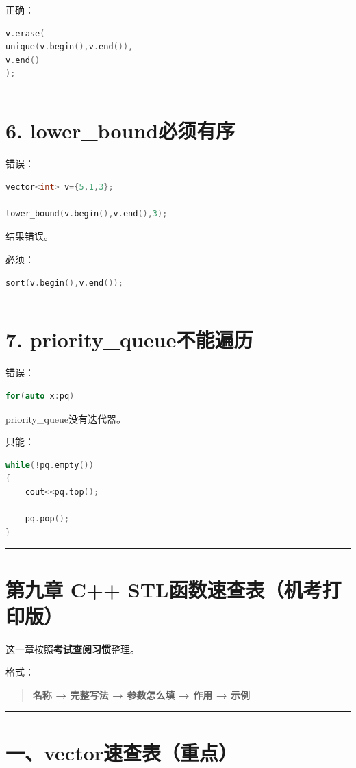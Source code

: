 \documentclass[9pt,twocolumn]{extarticle}
\begin{document}
正确：
\begin{lstlisting}[language=C++]
v.erase(
unique(v.begin(),v.end()),
v.end()
);
\end{lstlisting}

\noindent\rule{\linewidth}{0.4pt}

\section{6. lower\_bound必须有序}
错误：
\begin{lstlisting}[language=C++]
vector<int> v={5,1,3};

lower_bound(v.begin(),v.end(),3);
\end{lstlisting}
结果错误。

必须：
\begin{lstlisting}[language=C++]
sort(v.begin(),v.end());
\end{lstlisting}

\noindent\rule{\linewidth}{0.4pt}

\section{7. priority\_queue不能遍历}
错误：
\begin{lstlisting}[language=C++]
for(auto x:pq)
\end{lstlisting}
priority\_queue没有迭代器。

只能：
\begin{lstlisting}[language=C++]
while(!pq.empty())
{
    cout<<pq.top();

    pq.pop();
}
\end{lstlisting}

\noindent\rule{\linewidth}{0.4pt}

\section{第九章 C++ STL函数速查表（机考打印版）}

这一章按照\textbf{考试查阅习惯}整理。

格式：
\begin{quote}
\textbf{名称 → 完整写法 → 参数怎么填 → 作用 → 示例}
\end{quote}

\noindent\rule{\linewidth}{0.4pt}

\section{一、vector速查表（重点）}
\end{document}
